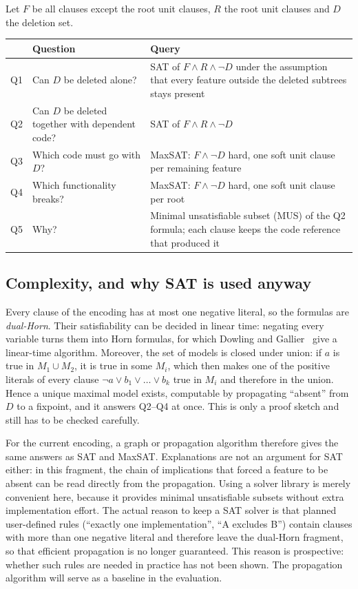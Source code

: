 \documentclass[11pt,a4paper]{article}
\begin{document}
Let $F$ be all clauses except the root unit clauses, $R$ the root unit
clauses and $D$ the deletion set.

\begin{center}
\begin{tabularx}{\textwidth}{@{}l X X@{}}
\toprule
& Question & Query \\
\midrule
Q1 & Can $D$ be deleted alone? &
  SAT of $F \land R \land \neg D$ under the assumption that every feature
  outside the deleted subtrees stays present \\
Q2 & Can $D$ be deleted together with dependent code? &
  SAT of $F \land R \land \neg D$ \\
Q3 & Which code must go with $D$? &
  MaxSAT: $F \land \neg D$ hard, one soft unit clause per remaining feature \\
Q4 & Which functionality breaks? &
  MaxSAT: $F \land \neg D$ hard, one soft unit clause per root \\
Q5 & Why? &
  Minimal unsatisfiable subset (MUS) of the Q2 formula; each clause keeps
  the code reference that produced it \\
\bottomrule
\end{tabularx}
\end{center}

\subsection{Complexity, and why SAT is used anyway}\label{sec:complexity}

Every clause of the encoding has at most one negative literal, so the
formulas are \emph{dual-Horn}. Their satisfiability can be decided in
linear time: negating every variable turns them into Horn formulas, for
which Dowling and Gallier~\cite{dowling1984} give a linear-time
algorithm.
Moreover, the set of models is closed under union: if $a$ is true in
$M_1 \cup M_2$, it is true in some $M_i$, which then makes one of the
positive literals of every clause $\neg a \lor b_1 \lor \dots \lor b_k$
true in $M_i$ and therefore in the union. Hence a unique maximal model
exists, computable by propagating ``absent'' from $D$ to a fixpoint, and it
answers Q2--Q4 at once. This is only a proof sketch and still has to be
checked carefully.

For the current encoding, a graph or propagation algorithm therefore gives
the same answers as SAT and MaxSAT. Explanations are not an argument for
SAT either: in this fragment, the chain of implications that forced a
feature to be absent can be read directly from the propagation. Using a
solver library is merely convenient here, because it provides minimal
unsatisfiable subsets without extra implementation effort. The actual
reason to keep a SAT solver is that planned user-defined rules
(``exactly one implementation'', ``A excludes B'') contain clauses with
more than one negative literal and therefore leave the dual-Horn
fragment, so that efficient propagation is no longer guaranteed. This
reason is prospective: whether such rules are needed in practice has not
been shown. The propagation algorithm will serve as a baseline in the
evaluation.
\end{document}
